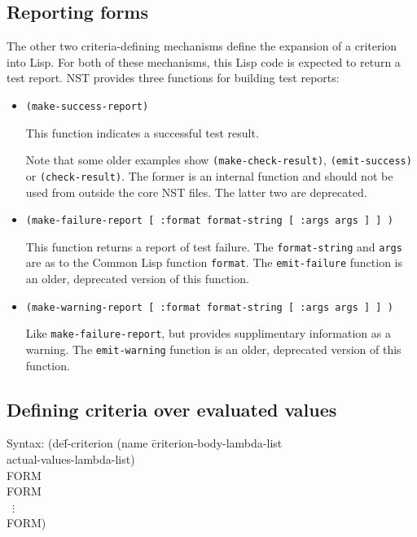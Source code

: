 \subsection{Reporting forms}
\label{sec:criteria-forms-report}
The other two criteria-defining mechanisms define the expansion of a
criterion into Lisp.  For both of these mechanisms, this Lisp code is
expected to return a test report.  NST provides three functions for
building test reports:
\begin{itemize}
\item\texttt{(make-success-report)}%
  \par This function indicates a successful test result.
  \par Note that some older examples show
  \texttt{(make-check-result)}, \texttt{(emit-success)} or
  \texttt{(check-result)}.  The former is an internal function and
  should not be used from outside the core NST files.  The latter two
  are deprecated.
\item\texttt{(make-failure-report [ :format format-string [ :args args ] ] )}%
  \par This function returns a report of test failure.  The
  \texttt{format-string} and \texttt{args} are as to the Common Lisp
  function \texttt{format}.  The \texttt{emit-failure} function is an
  older, deprecated version of this function.
\item\texttt{(make-warning-report [ :format format-string [ :args args ] ] )}%
  \par Like \texttt{make-failure-report}, but provides supplimentary
  information as a warning.  The \texttt{emit-warning} function is an
  older, deprecated version of this function.
\end{itemize}

\subsection{Defining criteria over evaluated values}
\label{sec:def-criterion}
{\ttfamily\begin{tabbing}
\textrm{Syntax: }(de\=f-criterion (name \=criterion-body-lambda-list
\\ \>            \>actual-values-lambda-list)
\\ \> FORM
\\ \> FORM
\\ \> ~$\vdots$
\\ \> FORM)
\end{tabbing}}%

